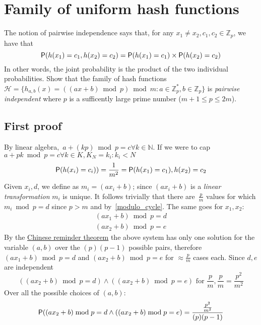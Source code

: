 \section{Family of uniform hash functions}

The notion of pairwise independence says that, for any $x_1 \neq x_2, c_1, c_2
\in \mathbb{Z}_p$, we have that
\begin{equation}
  \label{equation:pairwise-independence}
  \mathsf{P}(h(x_1)= c_1, h(x_2) = c_2) = \mathsf{P}(h(x_1) = c_1) \times \mathsf{P}(h(x_2) = c_2)
\end{equation}
In other words, the joint probability is the product of the two individual probabilities.
Show that the family of hash functions $\mathcal{H} = \{h_{a,b}(x) = ((ax + b) \bmod p) \bmod m :
a \in \mathbb{Z}^*_p,
b \in \mathbb{Z}_p \}$ is \emph{pairwise independent}
where $p$ is a sufficently large prime number ($m + 1 \leq p \leq 2m$).

\subsection{First proof}

By linear algebra,~\label{modulo_cycle}$a + (kp) \bmod p = c \forall k \in \mathbb{N}$.
If we were to cap $a + pk \bmod p = c \forall k \in K, K_{N} = {k_{i}: k_{i} < N}$
\begin{equation*}
  \mathsf{P}(h(x_{i}) = c_{i})) = \frac{1}{m^{2}} = \mathsf{P}(h(x_{1}) = c_{1}), h(x_{2}) = c_{2}
\end{equation*}
Given $x_{i}, d$, we define as $m_{i} = (a x_{i} + b)$; since $(a x_{i} + b)$
is a \emph{linear transformation} $m_{i}$ is unique.
It follows trivially that there are~\label{p_over_m}$\frac{p}{m}$ values for which $m_{i} \bmod p = d$
since $p > m$ and by~\ref{modulo_cycle}.
The same goes for $x_{1}, x_{2}$:
\begin{gather*}
  (a x_{1} + b) \bmod p = d \\
  (a x_{2} + b) \bmod p = e
\end{gather*}
By the \href{http://en.wikipedia.org/wiki/Chinese_remainder_theorem}{Chinese
reminder theorem} the above system has only one solution for the variable $(a, b)$
over the $(p)(p - 1)$ possible pairs, therefore $(a x_{1} + b) \bmod p = d$ and
$(a x_{2} + b) \bmod p = e$
for $\approx \frac{p}{m}$ cases each.
Since $d, e$ are independent
\begin{equation*}
  ((a x_{2} + b) \bmod p = d) \wedge ((a x_{2} + b) \bmod p = e) \textrm{ for }
  \frac{p}{m}, \frac{p}{m} = \frac{p^{2}}{m^{2}}
\end{equation*}
Over all the possible choices of $(a, b)$:
\begin{equation*}
  \mathsf{P}((a x_{2} + b) \bmod p = d \wedge  ((a x_{2} + b) \bmod p = e) = \frac{\frac{p^{2}}{m^{2}}}{(p)(p - 1)}
\end{equation*}

